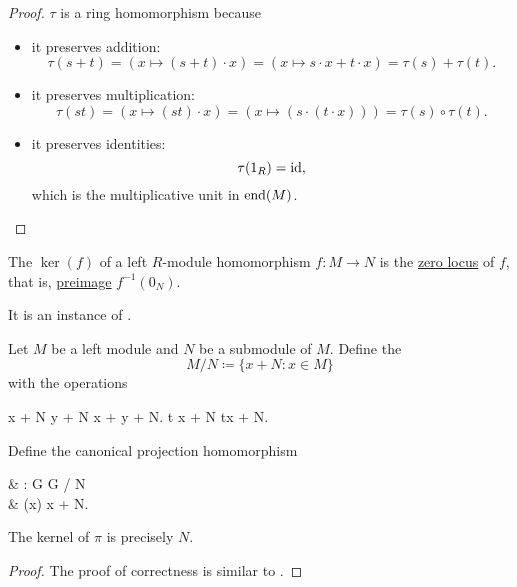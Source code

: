 \begin{proof}
  \( \tau \) is a ring homomorphism because
  \begin{itemize}
    \item it preserves addition:
          \begin{equation*}
            \tau(s + t)
            =
            (x \mapsto (s + t) \cdot x)
            =
            (x \mapsto s \cdot x + t \cdot x)
            =
            \tau(s) + \tau(t).
          \end{equation*}

    \item it preserves multiplication:
          \begin{equation*}
            \tau(st)
            =
            (x \mapsto (st) \cdot x)
            =
            (x \mapsto (s \cdot (t \cdot x)))
            =
            \tau(s) \circ \tau(t).
          \end{equation*}

    \item it preserves identities:
          \begin{equation*}
            \tau(1_R)
            =
            \operatorname{id},
          \end{equation*}
          which is the multiplicative unit in \( \operatorname{end}(M) \).
  \end{itemize}
\end{proof}

\begin{definition}\label{def:left_module_kernel}
  The  \( \ker(f) \) of a left \( R \)-module homomorphism \( f: M \to N \) is the \hyperref[def:zero_locus]{zero locus} of \( f \), that is, \hyperref[thm:def:function/properties/preimage]{preimage} \( f^{-1}(0_N) \).

  It is an instance of .
\end{definition}

\begin{definition}\label{def:quotient_left_module}
  Let \( M \) be a left module and \( N \) be a submodule of \( M \). Define the 
  \begin{equation*}
    M / N \coloneqq \{ x + N \colon x \in M \}
  \end{equation*}
  with the operations
  \begin{balign*}
    x + N \oplus y + N \coloneqq x + y + N.
    t \odot x + N \coloneqq tx + N.
  \end{balign*}

  Define the canonical projection homomorphism
  \begin{balign*}
     & \pi: G \to G / N        \\
     & \pi(x) \coloneqq x + N.
  \end{balign*}

  The kernel of \( \pi \) is precisely \( N \).
\end{definition}
\begin{proof}
  The proof of correctness is similar to .
\end{proof}

